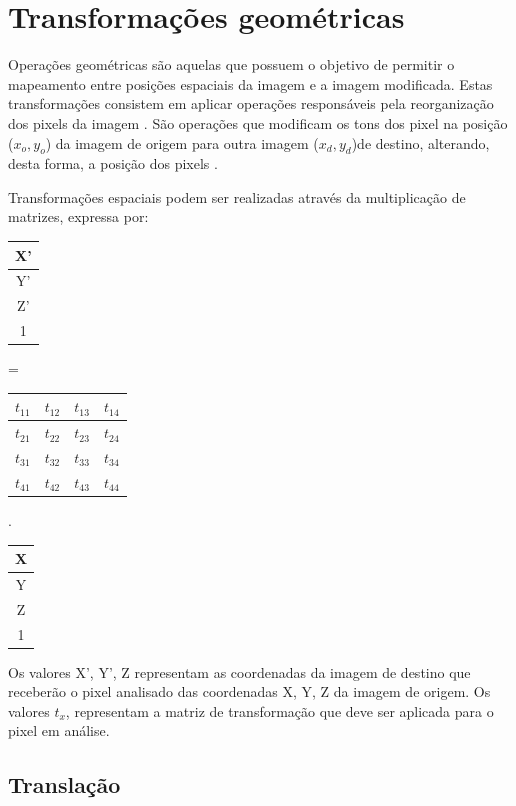 \documentclass[
	12pt,				%
	oneside,			%
	a4paper,			%
	english,			%
	french,				%
	spanish,			%
	brazil,				%
	]{abntex2}
\begin{document}
\section{Transformações geométricas}

Operações geométricas são aquelas que possuem o objetivo de permitir o mapeamento entre posições espaciais da imagem e a imagem modificada. Estas transformações consistem em aplicar operações responsáveis pela reorganização dos pixels da imagem \cite{pedriniSchwartz:2008}. São operações que modificam os tons dos pixel na posição (\(x_o, y_o\)) da imagem de origem para outra imagem (\(x_d, y_d\))de destino, alterando, desta forma, a posição dos pixels \cite{conciAzevedoLeta:2008}.

Transformações espaciais podem ser realizadas através da multiplicação de matrizes, expressa por:

\begin{tabular}{|c|}
    \hline
	X’       \\ \hline
	Y’       \\ \hline
	Z’       \\ \hline
    1        \\ \hline
\end{tabular}
=
\begin{tabular}{|c|c|c|c|}
	\hline
    \(t_{11}\) & \(t_{12}\) & \(t_{13}\) & \(t_{14}\)   \\ \hline
	\(t_{21}\) & \(t_{22}\) & \(t_{23}\) & \(t_{24}\)   \\ \hline   
	\(t_{31}\) & \(t_{32}\) & \(t_{33}\) & \(t_{34}\)   \\ \hline   
	\(t_{41}\) & \(t_{42}\) & \(t_{43}\) & \(t_{44}\)   \\ \hline   
\end{tabular}
.
\begin{tabular}{|c|}
    \hline
	X       \\ \hline
	Y       \\ \hline
	Z       \\ \hline
    1        \\ \hline
\end{tabular}

Os valores X’, Y’, Z representam as coordenadas da imagem de destino que receberão o pixel analisado das coordenadas X, Y, Z da imagem de origem. Os valores \(t_x\), representam a matriz de transformação que deve ser aplicada para o pixel em análise.

\subsection{Translação}
\end{document}
